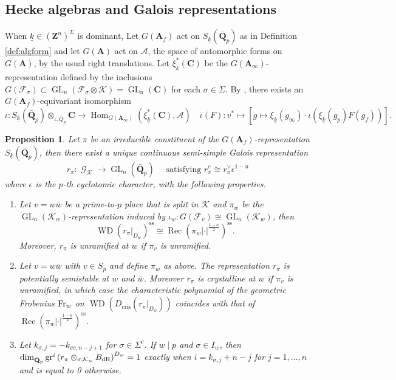 \documentclass[leqno]{amsart}
\newtheorem{prop}[thm]{Proposition}
\theoremstyle{definition}
\theoremstyle{remark}
\newcommand{\Q}{{\mathbf{Q}}}
\newcommand{\Z}{{\mathbf{Z}}}
\newcommand{\C}{\mathbf C}
\newcommand{\A}{\mathbf A}
\DeclareMathOperator{\Hom}{Hom}
\DeclareMathOperator{\GL}{GL}
\DeclareMathOperator{\Gal}{\mathcal{G}}
\DeclareMathOperator{\WD}{WD}
\DeclareMathOperator{\Rec}{Rec}
\newcommand{\Fr}{\textnormal{Fr}} %
\newcommand{\dR}{\textnormal{dR}}
\newcommand{\F}{{\mathcal{F}}} %
\newcommand{\K}{{\mathcal{K}}} %
\newcommand{\bw}{\overline{w}}
\newcommand{\wt}[1]{\underline{ #1 }}
\begin{document}
\subsection{Hecke algebras and Galois representations}

When $\wt{k}\in (\Z^n)^{\Sigma}$ is dominant,
Let $G(\A_f)$ act on $S_{\wt{k}}(\bar{\Q}_p)$
as in Definition \ref{def:algform} and
let $G(\A)$ act on $\mathcal{A}$,
the space of automorphic forms on $G(\A)$,
by the usual right translations.
Let $\xi_{\wt{k}}^*(\C)$ be the
$G(\A_\infty)$-representation
defined by the inclusions
$G(\F_\sigma)\subset \GL_n(\F_\sigma\otimes \K)=\GL_n(\C)$
for each $\sigma\in \Sigma$.
By \cite[Prop 3.3.2]{CHT},
there exists an $G(\A_f)$-equivariant isomorphism
\begin{equation}\label{eq:p_to_infty}
	\iota\colon S_{\wt{k}}(\bar{\Q}_p)\otimes_{\iota,\bar{Q}_p}\C
	\rightarrow \Hom_{G(\A_\infty)} (\xi_{\wt{k}}^*(\C), \mathcal{A})\quad
	\iota(F)\colon v^*\mapsto 
	[g\mapsto \xi_{\wt{k}}(g_\infty)\cdot 
    \iota\left(\xi_{\wt{k}}(g_p)F(g_f)\right)].
\end{equation}


\begin{prop}\cite[Prop.2.27]{ger}
	Let $\pi$ be an irreducible constituent of the
	$G(\A_f)$-representation $S_{\wt{k}}(\bar{\Q}_p)$,
	then there exist a unique 
	continuous semi-simple Galois representation
	\[
	r_\pi: \Gal_\K \rightarrow \GL_n(\bar{\Q}_p)\quad
	\text{ satisfying }
	r_\pi^c \cong r_\pi^{\vee} \epsilon^{1-n}
	\]
	where $\epsilon$ is the $p$-th cyclotomic character,
	with the following properties.
\begin{enumerate}[label=(\alph*)]
\item Let $v=w\bw$ be a prime-to-$p$ place that is split in $\K$
and $\pi_w$ be the $\GL_n(\K_w)$-representation
induced by $\iota_w\colon G(\F_v)\cong \GL_n(\K_w)$, then
\[
\WD\left(\left.r_\pi\right|_{D_w}\right)^{\mathrm{ss}} \cong
\Rec(\pi_w|\cdot|^{\frac{1-n}{2}})^{\mathrm{ss}}.
\]
Moreover, $r_\pi$ is unramified at $w$ if $\pi_v$ is unramified.
\item Let $v=w\bw$ with $v\in S_p$ and define $\pi_w$ as above.
The representation $r_\pi$ is potentially semistable at $w$ and  $\bw$.
Moreover $r_\pi$ is crystalline at $w$ 
if $\pi_v$ is unramified,
in which case 
the characteristic polynomial of the geometric Frobenius $\Fr_w$
on $\WD\left(D_{\mathrm{cris }}\left(\left.r_\pi\right|_{D_w}\right)\right)$
coincides with that of $\Rec(\pi_w|\cdot|^{\frac{1-n}{2}})^{\mathrm{ss}}$.
\item 
Let $k_{\sigma,j}=-k_{\sigma c, n-j+1}$
for $\sigma\in \Sigma^c$.
If $w\mid p$ and  $\sigma\in I_w$, then 
$\dim_{\bar{\Q}_p}\operatorname{gr}^i
\left(r_\pi \otimes_{\sigma, \K_w} B_{\dR}\right)^{D_w}=1$
exactly when $i=k_{\sigma, j}+n-j$ 
for $j=1, \ldots, n$ and is equal to 0 otherwise.
\end{enumerate}
\end{prop}
\end{document}
